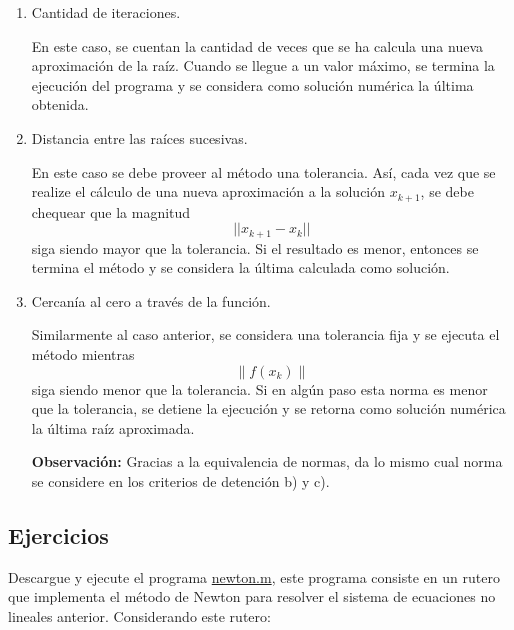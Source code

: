 \documentclass[letter,11pt]{article}
\newcommand\0{\mathbf{0}}
\begin{document}
\begin{enumerate}
\item Cantidad de iteraciones.

	En este caso, se cuentan la cantidad de veces que se ha calcula una nueva aproximaci\'on de la ra\'iz. Cuando se llegue a un valor m\'aximo, se termina la ejecuci\'on del programa y se considera como soluci\'on num\'erica la \'ultima obtenida.

\item Distancia entre las ra\'ices sucesivas.

En este caso se debe proveer al m\'etodo una tolerancia. As\'i, cada vez que se realize el c\'alculo de una nueva aproximaci\'on a la soluci\'on $x_{k+1}$, se debe chequear que la magnitud
$$
||x_{k+1}-x_{k}||
$$
siga siendo mayor que la tolerancia. Si el resultado es menor, entonces se termina el m\'etodo y se considera la \'ultima calculada como soluci\'on.

\item Cercan\'ia al cero a trav\'es de la funci\'on.

Similarmente al caso anterior, se considera una tolerancia fija y se ejecuta el m\'etodo mientras
$$
\|f(x_k)\|
$$
siga siendo menor que la tolerancia. Si en alg\'un paso esta norma es menor que la tolerancia, se detiene la ejecuci\'on y se retorna como soluci\'on num\'erica la \'ultima ra\'iz aproximada.

\textbf{Observaci\'on:} Gracias a la equivalencia de normas, da lo mismo cual norma se considere en los criterios de detenci\'on b) y c).

\end{enumerate}

\subsection{Ejercicios}
Descargue y ejecute el programa
    \href{ftp://ftp.ing-mat.udec.cl/pub/ing-mat/asignaturas/521230/ejercicios/2018-1/newton.m}{newton.m}, este programa consiste en un rutero que implementa el m\'etodo de Newton para resolver el sistema de ecuaciones no lineales anterior. Considerando este rutero:
    
\end{document}
